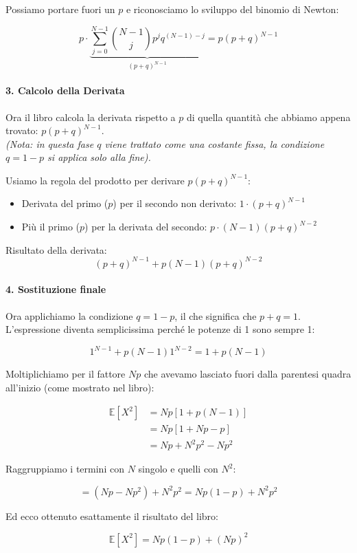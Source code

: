 Possiamo portare fuori un $p$ e riconosciamo lo sviluppo del binomio di Newton:

\[
p \cdot \underbrace{\sum_{j=0}^{N-1} \binom{N-1}{j} p^{j} q^{(N-1)-j}}_{(p+q)^{N-1}} = p(p+q)^{N-1}
\]

\paragraph{3. Calcolo della Derivata}
Ora il libro calcola la derivata rispetto a $p$ di quella quantità che abbiamo appena trovato: $p(p+q)^{N-1}$.
\\\textit{(Nota: in questa fase $q$ viene trattato come una costante fissa, la condizione $q=1-p$ si applica solo alla fine).}

Usiamo la regola del prodotto per derivare $p(p+q)^{N-1}$:
\begin{itemize}
    \item Derivata del primo ($p$) per il secondo non derivato: $1 \cdot (p+q)^{N-1}$
    \item Più il primo ($p$) per la derivata del secondo: $p \cdot (N-1)(p+q)^{N-2}$
\end{itemize}

Risultato della derivata:
\[
(p+q)^{N-1} + p(N-1)(p+q)^{N-2}
\]

\paragraph{4. Sostituzione finale}
Ora applichiamo la condizione $q = 1-p$, il che significa che $p+q = 1$.
L'espressione diventa semplicissima perché le potenze di 1 sono sempre 1:

\[
1^{N-1} + p(N-1)1^{N-2} = 1 + p(N-1)
\]

Moltiplichiamo per il fattore $Np$ che avevamo lasciato fuori dalla parentesi quadra all'inizio (come mostrato nel libro):

\[
\begin{aligned}
\mathbb{E}[X^2] &= Np [ 1 + p(N-1) ] \\
&= Np [ 1 + Np - p ] \\
&= Np + N^2 p^2 - Np^2
\end{aligned}
\]

Raggruppiamo i termini con $N$ singolo e quelli con $N^2$:

\[
= (Np - Np^2) + N^2 p^2 = Np(1-p) + N^2 p^2
\]

Ed ecco ottenuto esattamente il risultato del libro:

\begin{equation}
\mathbb{E}[X^2] = Np(1-p) + (Np)^2
\end{equation}

